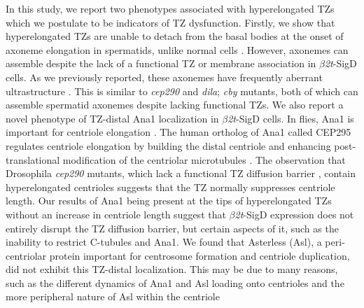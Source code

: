 \documentclass[12pt, twoside, letterpaper]{article}
\newcommand{\sigd}{$\beta$\textit{2t}-SigD}
\begin{document}
\begin{doublespacing}
\begin{linenumbers}
    In this study, we report two phenotypes associated with
    hyperelongated TZs which we postulate to be indicators of
    TZ dysfunction.
    Firstly, we show that hyperelongated TZs are unable to
    detach from the basal bodies at the onset of axoneme elongation
    in spermatids, unlike normal cells \citep{basiri2014migrating, fabian2012drosophila}.
    However, axonemes can assemble despite the lack of a functional
    TZ or membrane association in \sigd{} cells.
    As we previously reported, these axonemes have frequently aberrant
    ultrastructure \citep{wei2008depletion}.
    This is similar to \textit{cep290} \citep{basiri2014migrating}
    and \textit{dila}; \textit{cby} \citep{vieillard2016transition}
    mutants,
    both of which can assemble spermatid axonemes despite lacking
    functional TZs.
    We also report a novel phenotype of TZ-distal Ana1 localization
    in \sigd{} cells.
    In flies, Ana1 is important for centriole elongation
    \citep{saurya2016drosophila}.
    The human ortholog of Ana1 called CEP295 regulates
    centriole elongation by building the distal centriole and
    enhancing post-translational modification of the centriolar
    microtubules \citep{chang2016cep295}.
    The observation that Drosophila \textit{cep290} mutants,
    which lack a functional TZ diffusion barrier
    \citep{basiri2014migrating},
    contain hyperelongated centrioles suggests that the
    TZ normally suppresses centriole length.
    Our results of Ana1 being present at the tips of hyperelongated TZs
    without an increase in centriole length suggest that \sigd{} expression
    does not entirely disrupt the TZ diffusion barrier, but certain aspects of it,
    such as the inability to restrict C-tubules and Ana1.
    We found that
    Asterless (Asl), a peri-centriolar protein
    \citep{blachon2008drosophila}
    important for centrosome formation and centriole duplication, did not
    exhibit this TZ-distal localization.
    This may be due to many reasons, such as the different dynamics of Ana1 and Asl
    loading onto centrioles \citep{fu2016conserved, saurya2016drosophila} and the
    more peripheral nature of Asl within the centriole \citep{blachon2008drosophila}
    

\end{linenumbers}
\end{doublespacing}
\end{document}
